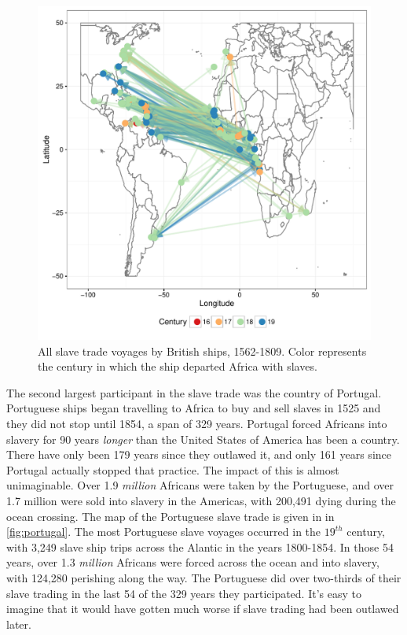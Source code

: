 \documentclass[DIV=calc, paper=a4, fontsize=10pt, twocolumn]{scrartcl}\usepackage[]{graphicx}\usepackage[]{color}
\makeatletter
\def\maxwidth{ %
  \ifdim\Gin@nat@width>\linewidth
    \linewidth
  \else
    \Gin@nat@width
  \fi
}
\newenvironment{knitrout}{}{} %
\makeatother
\begin{document}
\begin{knitrout}
\color{fgcolor}\begin{figure}[h]
\includegraphics[width=\maxwidth]{figure/gb-1} \caption[All slave trade voyages by British ships, 1562-1809]{All slave trade voyages by British ships, 1562-1809. Color represents the century in which the ship departed Africa with slaves.}\label{fig:gb}
\end{figure}


\end{knitrout}

The second largest participant in the slave trade was the country of Portugal. Portuguese ships began travelling to Africa to buy and sell slaves in 1525 and they did not stop until 1854, a span of 329 years. Portugal forced Africans into slavery for 90 years \emph{longer} than the United States of America has been a country. There have only been 179 years since they outlawed it, and only 161 years since Portugal actually stopped that practice. The impact of this is almost unimaginable. Over 1.9 \emph{million} Africans were taken by the Portuguese, and over 1.7 million were sold into slavery in the Americas, with 200,491 dying during the ocean crossing. The map of the Portuguese slave trade is given in in \autoref{fig:portugal}. The most Portuguese slave voyages occurred in the $19^{th}$ century, with 3,249 slave ship trips across the Alantic in the years 1800-1854. In those 54 years, over 1.3 \emph{million} Africans were forced across the ocean and into slavery, with 124,280 perishing along the way. The Portuguese did over two-thirds of their slave trading in the last 54 of the 329 years they participated. It's easy to imagine that it would have gotten much worse if slave trading had been outlawed later. 
 
\end{document}
